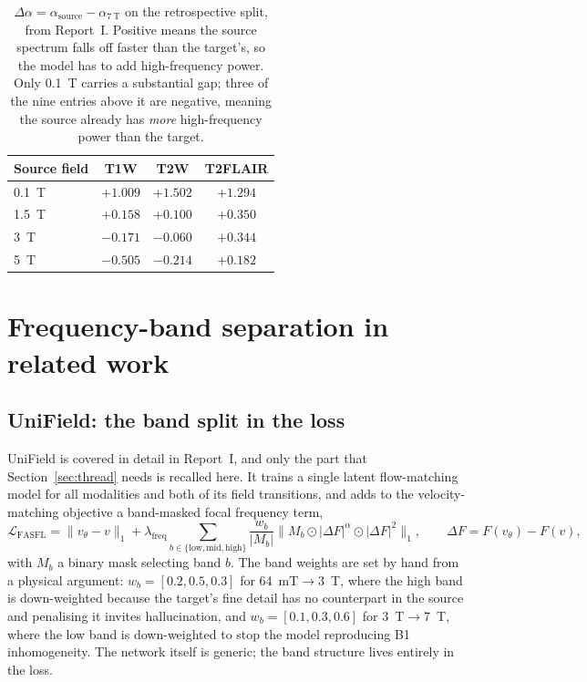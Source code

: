 \documentclass[11pt,a4paper]{article}
\newcommand{\best}[1]{\textbf{#1}}
\newcommand{\reportone}{Report~I}
\begin{document}
\begin{table}[H]
  \centering
  \small
  \caption{$\Delta\alpha = \alpha_{\text{source}} - \alpha_{\SI{7}{\tesla}}$ on the retrospective split,
  from \reportone{}. Positive means the source spectrum falls off faster than the target's, so the model
  has to add high-frequency power. Only \SI{0.1}{\tesla} carries a substantial gap; three of the nine
  entries above it are negative, meaning the source already has \emph{more} high-frequency power than
  the target.}
  \label{tab:dalpha}
  \begin{tabular}{lccc}
    \toprule
    Source field & T1W & T2W & T2FLAIR \\
    \midrule
    \SI{0.1}{\tesla} & \best{$+1.009$} & \best{$+1.502$} & \best{$+1.294$} \\
    \SI{1.5}{\tesla} & $+0.158$ & $+0.100$ & $+0.350$ \\
    \SI{3}{\tesla}   & $-0.171$ & $-0.060$ & $+0.344$ \\
    \SI{5}{\tesla}   & $-0.505$ & $-0.214$ & $+0.182$ \\
    \bottomrule
  \end{tabular}
\end{table}

\section{Frequency-band separation in related work}
\label{sec:lit}

\subsection{UniField: the band split in the loss}
\label{sec:unifield2}

UniField is covered in detail in \reportone{}, and only the part that Section~\ref{sec:thread} needs is
recalled here. It trains a single latent flow-matching model for all modalities and both of its field
transitions, and adds to the velocity-matching objective a band-masked focal frequency term,
\begin{equation}
  \mathcal{L}_{\text{FASFL}} = \lVert v_\theta - v \rVert_1
  + \lambda_{\text{freq}} \sum_{b \in \{\text{low},\text{mid},\text{high}\}}
  \frac{w_b}{|M_b|} \big\lVert M_b \odot |\Delta F|^{\alpha} \odot |\Delta F|^{2} \big\rVert_1,
  \qquad \Delta F = F(v_\theta) - F(v),
  \label{eq:fasfl}
\end{equation}
with $M_b$ a binary mask selecting band $b$. The band weights are set by hand from a physical argument:
$w_b = [0.2, 0.5, 0.3]$ for \SI{64}{\milli\tesla}$\rightarrow$\SI{3}{\tesla}, where the high band is
down-weighted because the target's fine detail has no counterpart in the source and penalising it invites
hallucination, and $w_b = [0.1, 0.3, 0.6]$ for \SI{3}{\tesla}$\rightarrow$\SI{7}{\tesla}, where the low
band is down-weighted to stop the model reproducing B1 inhomogeneity. The network itself is generic; the
band structure lives entirely in the loss.
\end{document}

